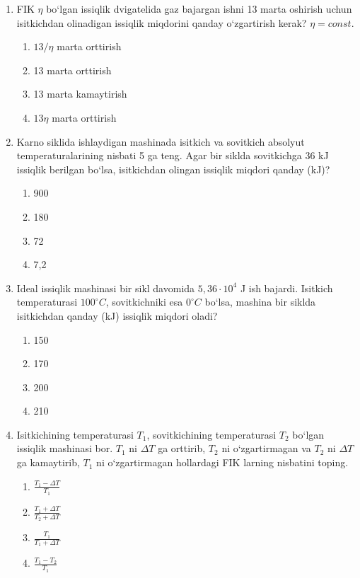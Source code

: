 \begin{enumerate}
\item FIK $\eta$ bo‘lgan issiqlik dvigatelida gaz bajargan ishni 13 marta oshirish uchun isitkichdan olinadigan issiqlik miqdorini qanday o‘zgartirish kerak? $\eta = const$.
\begin{enumerate}[label=\Alph*)]
\item $13/\eta$ marta orttirish
\item 13 marta orttirish
\item 13 marta kamaytirish
\item $13\eta$ marta orttirish
\end{enumerate}

\item Karno siklida ishlaydigan mashinada isitkich va sovitkich absolyut temperaturalarining nisbati 5 ga teng. Agar bir siklda sovitkichga 36 kJ issiqlik berilgan bo‘lsa, isitkichdan olingan issiqlik miqdori qanday (kJ)?
\begin{enumerate}[label=\Alph*)]
\item 900
\item 180
\item 72
\item 7,2
\end{enumerate}

\item Ideal issiqlik mashinasi bir sikl davomida $5,36 \cdot 10^4$ J ish bajardi. Isitkich temperaturasi $100^\circ C$, sovitkichniki esa $0^\circ C$ bo‘lsa, mashina bir siklda isitkichdan qanday (kJ) issiqlik miqdori oladi?
\begin{enumerate}[label=\Alph*)]
\item 150
\item 170
\item 200
\item 210
\end{enumerate}

\item Isitkichining temperaturasi $T_1$, sovitkichining temperaturasi $T_2$ bo‘lgan issiqlik mashinasi bor. $T_1$ ni $\Delta T$ ga orttirib, $T_2$ ni o‘zgartirmagan va $T_2$ ni $\Delta T$ ga kamaytirib, $T_1$ ni o‘zgartirmagan hollardagi FIK larning nisbatini toping.
\begin{enumerate}[label=\Alph*)]
\item $\frac{T_1 - \Delta T}{T_1}$
\item $\frac{T_1 + \Delta T}{T_2 + \Delta T}$
\item $\frac{T_1}{T_1 + \Delta T}$
\item $\frac{T_1 - T_2}{T_1}$
\end{enumerate}


\end{enumerate}
